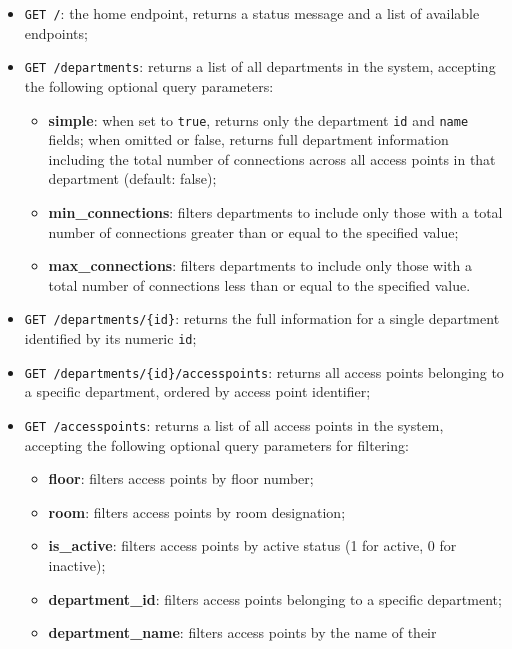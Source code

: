 \documentclass[12pt, a4paper]{report}
\begin{document}
\begin{itemize}
    \item \texttt{GET /}: the home endpoint, returns a status message and a list of
          available endpoints;
    \item \texttt{GET /departments}: returns a list of all departments in the system,
          accepting the following optional query parameters:
    \begin{itemize}
        \item \textbf{simple}: when set to \texttt{true}, returns only the department
              \texttt{id} and \texttt{name} fields; when omitted or false, returns full
              department information including the total number of connections across all
              access points in that department (default: false);
        \item \textbf{min\_connections}: filters departments to include only those with
              a total number of connections greater than or equal to the specified value;
        \item \textbf{max\_connections}: filters departments to include only those with
              a total number of connections less than or equal to the specified value.
    \end{itemize}
    \item \texttt{GET /departments/\{id\}}: returns the full information for a single
          department identified by its numeric \texttt{id};
    \item \texttt{GET /departments/\{id\}/accesspoints}: returns all access points
          belonging to a specific department, ordered by access point identifier;
    \item \texttt{GET /accesspoints}: returns a list of all access points in the system,
          accepting the following optional query parameters for filtering:
    \begin{itemize}
        \item \textbf{floor}: filters access points by floor number;
        \item \textbf{room}: filters access points by room designation;
        \item \textbf{is\_active}: filters access points by active status (1 for active,
              0 for inactive);
        \item \textbf{department\_id}: filters access points belonging to a specific
              department;
        \item \textbf{department\_name}: filters access points by the name of their

\end{itemize}
\end{itemize}
\end{document}
